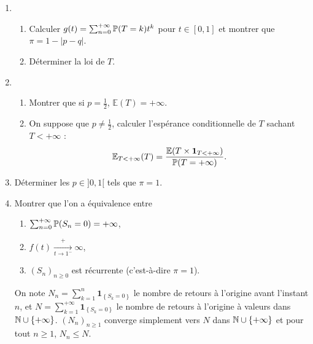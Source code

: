 \documentclass[12pt]{article}
\begin{document}
\begin{exercise}
\begin{enumerate}
        \item 
        \begin{enumerate}
            \item Calculer $g(t)=\sum_{n=0}^{+\infty}\P(T=k)t^{k}$ pour $t\in[0,1]$ et montrer que $\pi=1-\left\lvert p-q\right\rvert$.
            \item Déterminer la loi de $T$.
        \end{enumerate}

        \item 
        \begin{enumerate}
            \item Montrer que si $p=\frac{1}{2}$, $\mathbb{E}(T)=+\infty$.
            \item On suppose que $p\neq\frac{1}{2}$, calculer l'espérance conditionnelle de $T$ sachant $T<+\infty$ : 
            \begin{equation}
                \mathbb{E}_{T<+\infty}(T)=\frac{\mathbb{E}(T\times \mathbf{1}_{T<+\infty})}{\P(T=+\infty)}.
            \end{equation}
        \end{enumerate}

        \item Déterminer les $p\in]0,1[$ tels que $\pi =1$.
        \item Montrer que l'on a équivalence entre 
        \begin{enumerate}[label=(\roman*)]
            \item $\sum_{n=0}^{+\infty}\P(S_n=0)=+\infty$,
            \item $f(t)\xrightarrow[t\to1^{-}]+\infty$,
            \item $(S_n)_{n\geqslant0}$ est récurrente (c'est-à-dire $\pi=1$).
        \end{enumerate}

        On note $N_n=\sum_{k=1}^{n}\mathbf{1}_{\left\lbrace S_k=0\right\rbrace}$ le nombre de retours à l'origine avant l'instant $n$, et $N=\sum_{k=1}^{+\infty}\mathbf{1}_{\left\lbrace S_k=0\right\rbrace}$ le nombre de retours à l'origine à valeurs dans $\N\cup\left\lbrace+\infty\right\rbrace$. $(N_n)_{n\geqslant1}$ converge simplement vers $N$ dans $\N\cup\left\lbrace+\infty\right\rbrace$ et pour tout $n\geqslant1$, $N_n\leqslant N$.


\end{enumerate}
\end{exercise}
\end{document}
